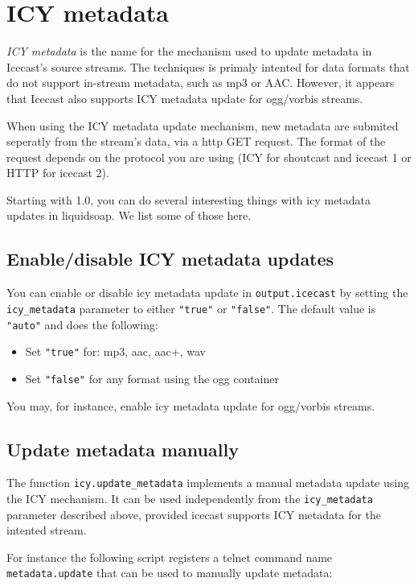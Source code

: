 \section{ICY metadata}
\emph{ICY metadata} is the name for the mechanism used to update
metadata in Icecast's source streams.
The techniques is primaly intented for data formats that do not support in-stream
metadata, such as mp3 or AAC. However, it appears that Icecast also supports
ICY metadata update for ogg/vorbis streams.

When using the ICY metadata update mechanism, new metadata are submited seperatly from
the stream's data, via a http GET request. The format of the request depends on the
protocol you are using (ICY for shoutcast and icecast 1 or HTTP for icecast 2).

Starting with 1.0, you can do several interesting things with icy metadata updates
in liquidsoap. We list some of those here.

\subsection{Enable/disable ICY metadata updates}
You can enable or disable icy metadata update in \verb+output.icecast+
by setting the \verb+icy_metadata+ parameter to either \verb+"true"+
or \verb+"false"+. The default value is \verb+"auto"+ and does the following:

\begin{itemize}
\item Set \verb+"true"+ for: mp3, aac, aac+, wav
\item Set \verb+"false"+ for any format using the ogg container

\end{itemize}
You may, for instance, enable icy metadata update for ogg/vorbis
streams.

\subsection{Update metadata manually}
The function \verb+icy.update_metadata+ implements a manual metadata update
using the ICY mechanism. It can be used independently from the \verb+icy_metadata+
parameter described above, provided icecast supports ICY metadata for the intented stream.

For instance the following script registers a telnet command name \verb+metadata.update+ 
that can be used to manually update metadata:

